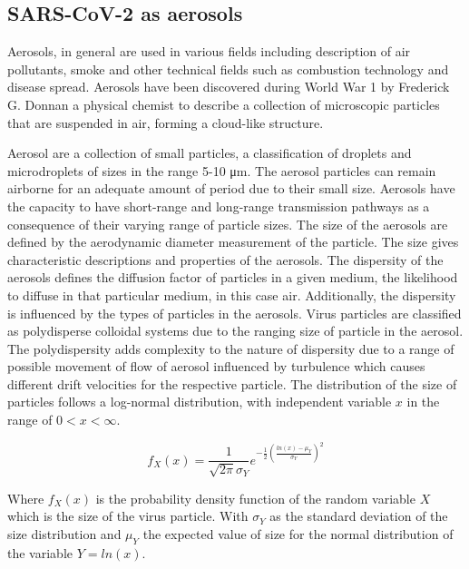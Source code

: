 \documentclass[11pt]{report}
\begin{document}
\subsection{SARS-CoV-2 as aerosols}

Aerosols, in general are used in various fields including description of air pollutants, smoke and other technical fields such as combustion technology and disease spread. Aerosols have been discovered during World War 1 by Frederick G. Donnan a physical chemist to describe a collection of microscopic particles that are suspended in air, forming a cloud-like structure. 

Aerosol are a collection of small particles, a classification of droplets and microdroplets of sizes in the range 5-10 \si{\micro\meter}. The aerosol particles can remain airborne for an adequate amount of period due to their small size. Aerosols have the capacity to have short-range and long-range transmission pathways as a consequence of their varying range of particle sizes. The size of the aerosols are defined by the aerodynamic diameter measurement of the particle. The size gives characteristic descriptions and properties of the aerosols. The dispersity of the aerosols defines the diffusion factor of particles in a given medium, the likelihood to diffuse in that particular medium, in this case air. Additionally, the dispersity is influenced by the types of particles in the aerosols. Virus particles are classified as polydisperse colloidal systems due to the ranging size of particle in the aerosol. The polydispersity adds complexity to the nature of dispersity due to a range of possible movement of flow of aerosol influenced by turbulence which causes different drift velocities for the respective particle. The distribution of the size of particles follows a log-normal distribution, with independent variable $x$ in the range of $0 < x < \infty $.

\begin{equation}
    f_X (x) = \frac{1}{\sqrt{2\pi}\sigma_Y} e^{-\frac{1}{2}(\frac{ln(x)-\mu_Y}{\sigma_Y})^2}
\end{equation}

Where $f_X(x)$ is the probability density function of the random variable $X$ which is the size of the virus particle. With $\sigma_Y$ as the standard deviation of the size distribution and $\mu_Y$ the expected value of size for the normal distribution of the variable $Y = ln(x)$. 
\end{document}
